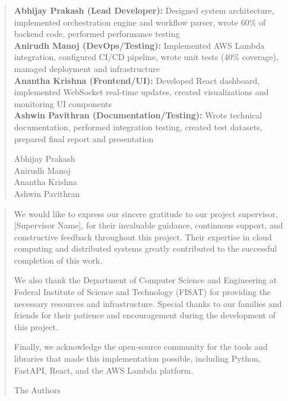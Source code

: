 \documentclass{fisatprojectfinal}
\begin{document}
\newpage
\renewcommand\abstractname{Contribution by Author}
\thispagestyle{plain}
\begin{abstract}
	\vspace{5cm}
	\textbf{Abhijay Prakash (Lead Developer):} Designed system architecture, implemented orchestration engine and workflow parser, wrote 60\% of backend code, performed performance testing \\
	
	\textbf{Anirudh Manoj (DevOps/Testing):} Implemented AWS Lambda integration, configured CI/CD pipeline, wrote unit tests (40\% coverage), managed deployment and infrastructure \\
	
	\textbf{Anantha Krishna (Frontend/UI):} Developed React dashboard, implemented WebSocket real-time updates, created visualizations and monitoring UI components \\
	
	\textbf{Ashwin Pavithran (Documentation/Testing):} Wrote technical documentation, performed integration testing, created test datasets, prepared final report and presentation \\
	
	\vspace{1cm}
	\begin{flushright}
		Abhijay Prakash\\
		Anirudh Manoj\\
		Anantha Krishna\\
		Ashwin Pavithran
	\end{flushright}
\end{abstract}

\newpage
\renewcommand\abstractname{ACKNOWLEDGMENT}
\thispagestyle{plain}
\begin{abstract}
	\vspace{5cm}
	We would like to express our sincere gratitude to our project supervisor, [Supervisor Name], for their invaluable guidance, continuous support, and constructive feedback throughout this project. Their expertise in cloud computing and distributed systems greatly contributed to the successful completion of this work.
	
	We also thank the Department of Computer Science and Engineering at Federal Institute of Science and Technology (FISAT) for providing the necessary resources and infrastructure. Special thanks to our families and friends for their patience and encouragement during the development of this project.
	
	Finally, we acknowledge the open-source community for the tools and libraries that made this implementation possible, including Python, FastAPI, React, and the AWS Lambda platform.
	\vspace{1cm}
	\begin{flushright}
		The Authors
	\end{flushright}
\end{abstract}
\end{document}
